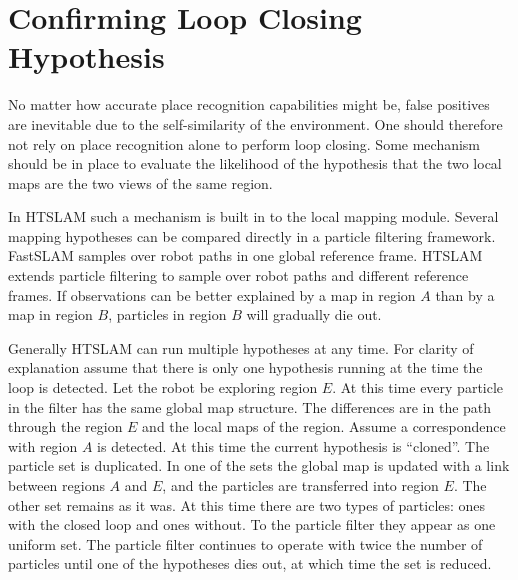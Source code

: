 %
%
%
%


\section{Confirming Loop Closing Hypothesis}
\label{sec:loop_confirm}

No matter how accurate place recognition capabilities might be, false
positives are inevitable due to the self-similarity of the
environment. One should therefore not rely on place recognition alone to
perform loop closing. Some mechanism should be in place to evaluate the
likelihood of the hypothesis that the two local maps are the two views
of the same region.

In HTSLAM such a mechanism is built in to the local mapping
module. Several mapping hypotheses can be compared directly in a
particle filtering framework. FastSLAM samples over robot paths in one
global reference frame. HTSLAM extends particle filtering to sample
over robot paths and different reference frames. If observations can
be better explained by a map in region $A$ than by a map in region
$B$, particles in region $B$ will gradually die out.

Generally HTSLAM can run multiple hypotheses at any time. For clarity
of explanation assume that there is only one hypothesis running at the
time the loop is detected. Let the robot be exploring region $E$. At
this time every particle in the filter has the same global map
structure. The differences are in the path through the region $E$ and
the local maps of the region. Assume a correspondence with region $A$
is detected. At this time the current hypothesis is ``cloned''. The
particle set is duplicated. In one of the sets the global map is
updated with a link between regions $A$ and $E$, and the particles are
transferred into region $E$. The other set remains as it was. At this
time there are two types of particles: ones with the closed loop and
ones without. To the particle filter they appear as one uniform
set. The particle filter continues to operate with twice the number of
particles until one of the hypotheses dies out, at which time the set
is reduced.

